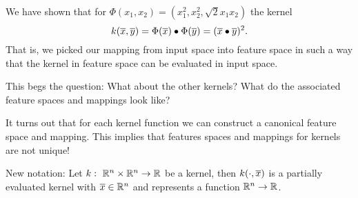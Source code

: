 \documentclass[a4paper,blends,pdf,colorBG,slideColor]{prosper}
\begin{document}

We have shown that for $\Phi(x_1,x_2) = (x_1^2,x_2^2,\sqrt{2}x_1 x_2)$ the kernel
\begin{equation*}
k(\overline{x},\overline{y}) = \Phi(\overline{x})\bullet\Phi(\overline{y}) = (\overline{x}\bullet\overline{y})^2.
\end{equation*}
That is, we picked our mapping from input space into feature space in such a way that the kernel
in feature space can be evaluated in input space.

This begs the question: What about the other kernels? What do the associated feature spaces
and mappings look like?

It turns out that for each kernel function we can construct a canonical feature space and mapping.
This implies that features spaces and mappings for kernels are not unique!
\es

\small
\vspace{.2in}
\es

\small
New notation:  Let $k\,\colon\; \mathbb{R}^{n} \times \mathbb{R}^{n} \rightarrow \mathbb{R}$
be a kernel, then $k(\cdot, \overline{x})$ is a partially evaluated kernel with $\overline{x} \in \mathbb{R}^{n}$ and
represents a function $\mathbb{R}^{n} \rightarrow \mathbb{R}$.

\vspace{.2in}
\es
\end{document}
